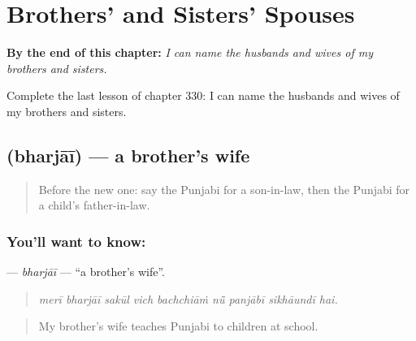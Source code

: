 
\chapter{Brothers' and Sisters' Spouses}
\label{ch:pa-a2-brothers-and-sisters-spouses}

\begin{chapteropening}
\textbf{By the end of this chapter:} \emph{I can name the husbands and wives of my brothers and sisters.}

Complete the last lesson of chapter 330: I can name the husbands and wives of my brothers and sisters.
\end{chapteropening}

\section[\texorpdfstring{\pa{ਭਰਜਾਈ} (bharjāī)}{ਭਰਜਾਈ (bharjāī)}]{ (bharjāī) — a brother's wife}

\label{lesson:PA-C330-bharjai}



\begin{quote}
Before the new one: say the Punjabi for a son-in-law, then the Punjabi for a child's father-in-law.
\end{quote}

\subsection*{You'll want to know: }
\textbf{} — \emph{bharjāī} — \textquotedblleft{}a brother's wife\textquotedblright{}.

\begin{quote}
        
\end{quote}

\begin{quote}
\emph{merī bharjāī sakūl vich bachchiāṁ nū̃ panjābī sikhāundī hai.}
\end{quote}

\begin{quote}
My brother's wife teaches Punjabi to children at school.
\end{quote}

